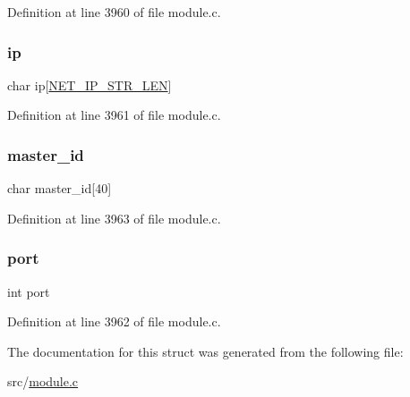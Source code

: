 Definition at line 3960 of file module.\+c.

\mbox{\label{structmodule_cluster_node_info_a9de2afd4e77c16f677244d244270b605}} 
\subsubsection{\texorpdfstring{ip}{ip}}
{\footnotesize\ttfamily char ip\mbox{[}\hyperlink{server_8h_ad97c5405ed22a94e9fcc10fba577d6c0}{N\+E\+T\+\_\+\+I\+P\+\_\+\+S\+T\+R\+\_\+\+L\+EN}\mbox{]}}



Definition at line 3961 of file module.\+c.

\mbox{\label{structmodule_cluster_node_info_ab95368416ffd4d1b80277de1b0c2c32d}} 
\subsubsection{\texorpdfstring{master\+\_\+id}{master\_id}}
{\footnotesize\ttfamily char master\+\_\+id\mbox{[}40\mbox{]}}



Definition at line 3963 of file module.\+c.

\mbox{\label{structmodule_cluster_node_info_a63c89c04d1feae07ca35558055155ffb}} 
\subsubsection{\texorpdfstring{port}{port}}
{\footnotesize\ttfamily int port}



Definition at line 3962 of file module.\+c.



The documentation for this struct was generated from the following file\+:\begin{DoxyCompactItemize}
\item 
src/\hyperlink{module_8c}{module.\+c}\end{DoxyCompactItemize}
